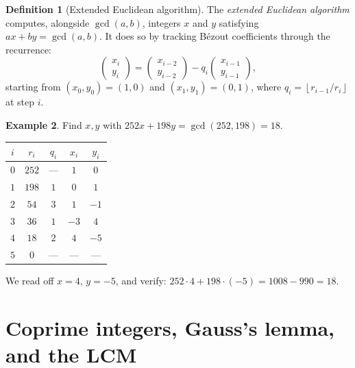 \documentclass[12pt,a4paper,openany]{book}
\theoremstyle{definition}
\newtheorem{definition}{Definition}[chapter]
\newtheorem{example}[definition]{Example}
\theoremstyle{plain}
\theoremstyle{remark}
\newcommand{\floor}[1]{\left\lfloor #1 \right\rfloor}
\begin{document}
\begin{definition}[Extended Euclidean algorithm]
\label{def:extended-euclidean}
The \emph{extended Euclidean algorithm} computes, alongside $\gcd(a,b)$,
integers $x$ and $y$ satisfying $ax + by = \gcd(a,b)$. It does so by
tracking B\'{e}zout coefficients through the recurrence:
\[
  \begin{pmatrix} x_i \\ y_i \end{pmatrix}
  = \begin{pmatrix} x_{i-2} \\ y_{i-2} \end{pmatrix}
  - q_i \begin{pmatrix} x_{i-1} \\ y_{i-1} \end{pmatrix},
\]
starting from $(x_0, y_0) = (1, 0)$ and $(x_1, y_1) = (0, 1)$, where
$q_i = \floor{r_{i-1}/r_i}$ at step $i$.
\end{definition}

\begin{example}
\label{ex:extended-euclidean}
Find $x,y$ with $252x + 198y = \gcd(252,198) = 18$.

\medskip
\begin{center}
\begin{tabular}{c c c c c}
\toprule
$i$ & $r_i$ & $q_i$ & $x_i$ & $y_i$ \\
\midrule
$0$ & $252$ & --- & $1$ & $0$ \\
$1$ & $198$ & $1$ & $0$ & $1$ \\
$2$ & $54$ & $3$ & $1$ & $-1$ \\
$3$ & $36$ & $1$ & $-3$ & $4$ \\
$4$ & $18$ & $2$ & $4$ & $-5$ \\
$5$ & $0$ & --- & --- & --- \\
\bottomrule
\end{tabular}
\end{center}

\medskip
We read off $x = 4$, $y = -5$, and verify: $252 \cdot 4 + 198 \cdot(-5) = 1008 - 990 = 18$. \checkmark
\end{example}

\section{Coprime integers, Gauss's lemma, and the LCM}
\label{sec:coprime-lcm}
\end{document}
